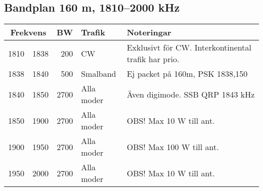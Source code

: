 {\subsection{Bandplan 160 m, 1810--2000 kHz}
\begin{tabular}{rrrll}
\multicolumn{2}{c}{\textbf{Frekvens}} & \textbf{BW} & \textbf{Trafik} & \textbf{Noteringar} \\ \hline
1810 & 1838 & 200  & CW         & Exklusivt för CW. Interkontinental trafik har prio. \\ \hline
1838 & 1840 & 500  & Smalband   & Ej packet på 160m, PSK 1838,150                    \\ \hline
1840 & 1850 & 2700 & Alla moder & Även digimode. SSB QRP 1843 kHz                    \\ \hline
1850 & 1900 & 2700 & Alla moder & OBS! Max 10 W till ant.                             \\ \hline
1900 & 1950 & 2700 & Alla moder & OBS! Max 100 W till ant.                            \\ \hline
1950 & 2000 & 2700 & Alla moder & OBS! Max 10 W till ant.                             \\ \hline
\end{tabular}

}
